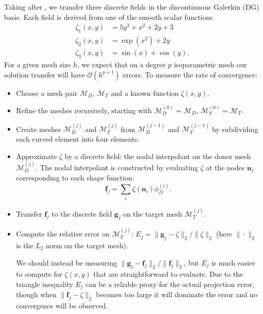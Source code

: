 \documentclass[letterpaper,10pt]{article}
\theoremstyle{definition}
\newcommand{\bigO}[1]{\mathcal{O}\left(#1\right)}
\begin{document}
Taking after \cite{Farrell2011}, we transfer three
discrete fields in the discontinuous Galerkin (DG) basis.
Each field is derived from one of the smooth scalar functions
\begin{align}
\zeta_1(x, y) &= 5 y^3 + x^2 + 2y + 3 \\
\zeta_2(x, y) &= \exp\left(x^2\right) + 2y \\
\zeta_3(x, y) &= \sin(x) + \cos(y).
\end{align}
For a given mesh size \(h\), we expect that on a degree \(p\) isoparametric
mesh our solution transfer will have \(\bigO{h^{p + 1}}\) errors. To measure
the rate of convergence:
\begin{itemize}
\itemsep 0em
\item Choose a mesh pair \(\mathcal{M}_D\), \(\mathcal{M}_T\) and
a known function \(\zeta(x, y)\).
\item Refine the meshes recursively, starting with
  \(\mathcal{M}_D^{(0)} = \mathcal{M}_D\),
  \(\mathcal{M}_T^{(0)} = \mathcal{M}_T\).
\item Create meshes
\(\mathcal{M}_D^{(j)}\) and \(\mathcal{M}_T^{(j)}\) from
\(\mathcal{M}_D^{(j - 1)}\)
and \(\mathcal{M}_T^{(j - 1)}\) by subdividing each curved
element into four elements.
\item Approximate \(\zeta\) by a discrete field: the nodal
interpolant on the donor mesh \(\mathcal{M}_D^{(j)}\). The
nodal interpolant is constructed by evaluating \(\zeta\) at the
nodes \(\bm{n}_j\) corresponding to each shape function:
\begin{equation}
\bm{f}_j = \sum_i \zeta\left(\bm{n}_i\right) \phi_D^{(i)}.
\end{equation}
\item Transfer \(\bm{f}_j\) to the discrete field \(\bm{g}_j\) on
the target mesh  \(\mathcal{M}_T^{(j)}\).
\item Compute the relative error on \(\mathcal{M}_T^{(j)}\):
\(E_j = \| \bm{g}_j - \zeta \|_2 / \| \zeta \|_2\) (here \(\| \cdot \|_2\)
is the \(L_2\) norm on the target mesh).

We should instead be measuring \(\| \bm{g}_j - \bm{f}_j \|_2 /
\| \bm{f}_j \|_2\), but \(E_j\) is much easier to
compute for \(\zeta(x, y)\) that are straightforward to evaluate.
Due to the triangle inequality \(E_j\) can be a reliable proxy
for the actual projection error, though when
\(\| \bm{f}_j - \zeta \|_2\) becomes too large it will dominate
the error and no convergence will be observed.
\end{itemize}
\end{document}
